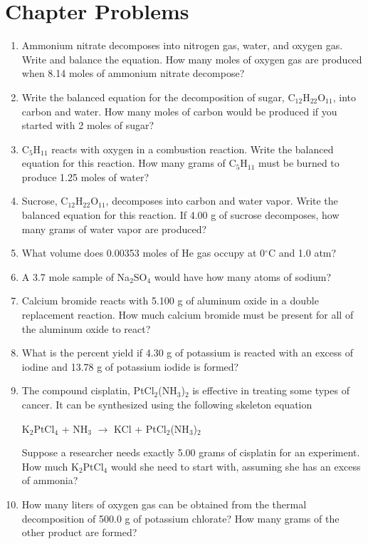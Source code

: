 \documentclass[../hchem.tex]{subfiles}
\begin{document}
\section*{Chapter Problems}
\begin{enumerate}
    \item Ammonium nitrate decomposes into nitrogen gas, water, and oxygen gas. Write and balance the equation. How many moles of oxygen gas are produced when 8.14 moles of ammonium nitrate decompose?
    \item Write the balanced equation for the decomposition of sugar, C$_{12}$H$_{22}$O$_{11}$, into carbon and water. How many moles of carbon would be produced if you started with 2 moles of sugar?
    \item C$_5$H$_{11}$ reacts with oxygen in a combustion reaction. Write the balanced equation for this reaction. How many grams of C$_5$H$_{11}$ must be burned to produce 1.25 moles of water?
    \item Sucrose, C$_{12}$H$_{22}$O$_{11}$, decomposes into carbon and water vapor. Write the balanced equation for this reaction. If 4.00 g of sucrose decomposes, how many grams of water vapor are produced?
    \item What volume does 0.00353 moles of He gas occupy at 0$^{\circ}$C and 1.0 atm?
    \item A 3.7 mole sample of Na$_2$SO$_4$ would have how many atoms of sodium?
    \item Calcium bromide reacts with 5.100 g of aluminum oxide in a double replacement reaction. How much calcium bromide must be present for all of the aluminum oxide to react?
    \item What is the percent yield if 4.30 g of potassium is reacted with an excess of iodine and 13.78 g of potassium iodide is formed?
    \item The compound cisplatin, PtCl$_2$(NH$_3$)$_2$ is effective in treating some types of cancer. It can be synthesized using the following skeleton equation
    \begin{center}
        K$_2$PtCl$_4$ + NH$_3$ $\rightarrow$ KCl + PtCl$_2$(NH$_3$)$_2$
    \end{center}
    Suppose a researcher needs exactly 5.00 grams of cisplatin for an experiment. How much K$_2$PtCl$_4$ would she need to start with, assuming she has an excess of ammonia?
    \item How many liters of oxygen gas can be obtained from the thermal decomposition of 500.0 g of potassium chlorate? How many grams of the other product are formed?
\end{enumerate}
\end{document}
